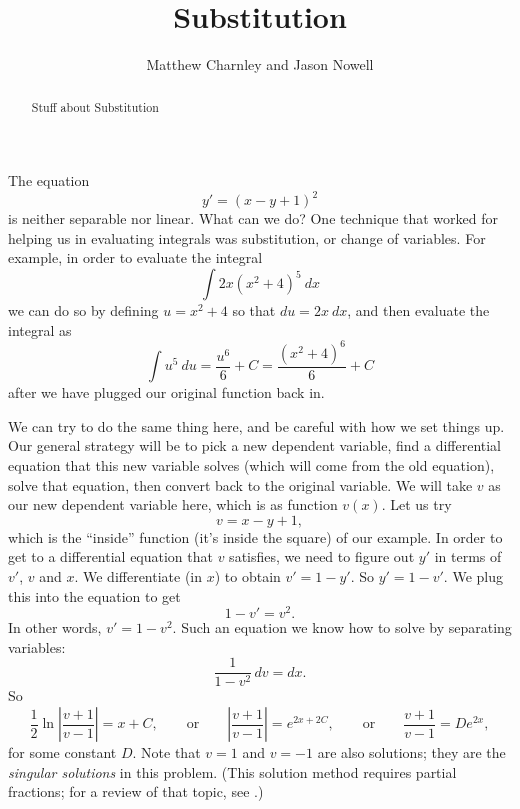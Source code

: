 \documentclass{ximera}
\title{Substitution}
\author{Matthew Charnley and Jason Nowell}
\begin{document}
\begin{abstract}
    Stuff about Substitution
\end{abstract}
\maketitle

\label{substitution:section}



The equation
\begin{equation*}
    y' = {(x-y+1)}^2 
\end{equation*}
is neither separable nor linear.  What can we do? One technique that worked for helping us in evaluating integrals was substitution, or change of variables. For example, in order to evaluate the integral
\begin{equation*}
    \int 2x(x^2 + 4)^5 \ dx
\end{equation*} we can do so by defining $u = x^2 + 4$ so that $du = 2x\ dx$, and then evaluate the integral as 
\begin{equation*}
    \int u^5\ du = \frac{u^6}{6} + C = \frac{(x^2 + 4)^6}{6} + C
\end{equation*} after we have plugged our original function back in.

We can try to do the same thing here, and be careful with how we set things up. Our general strategy will be to pick a new dependent variable, find a differential equation that this new variable solves (which will come from the old equation), solve that equation, then convert back to the original variable. We will take $v$ as our new dependent variable here, which is as function $v(x)$. Let us try
\begin{equation*}
    v = x-y+1,
\end{equation*}
which is the ``inside'' function (it's inside the square) of our example. In order to get to a differential equation that $v$ satisfies, we need to figure out $y'$ in terms of $v'$, $v$ and $x$.  We differentiate (in $x$) to obtain $v' = 1 - y'$.  So $y' = 1-v'$.  We plug this into the equation to get
\begin{equation*}
    1-v' = v^2 .
\end{equation*}
In other words, $v' = 1-v^2$.  Such an equation we know how to solve by separating variables:
\begin{equation*}
    \frac{1}{1-v^2} \,dv = dx .
\end{equation*}
So
\begin{equation*}
    \frac{1}{2} \ln \left\lvert  \frac{v+1}{v-1} \right\rvert = x + C ,\qquad \text{or} \qquad \left\lvert \frac{v+1}{v-1} \right\rvert = e^{2x + 2C} , \qquad \text{or} \qquad \frac{v+1}{v-1} = D e^{2x} ,
\end{equation*}
for some constant $D$. Note that $v=1$ and $v=-1$ are also solutions; they are the \emph{singular solutions} in this problem. (This solution method requires partial fractions; for a review of that topic, see .)
\end{document}
